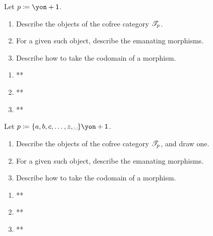 \documentclass[Book-Poly]{subfiles}
\begin{document}
\begin{exercise}
Let $p\coloneqq \yon+\1$.
\begin{enumerate}
	\item Describe the objects of the cofree category $\mathscr{T}_{p}$.
	\item For a given such object, describe the emanating morphisms.
	\item Describe how to take the codomain of a morphism.
\qedhere
\end{enumerate}
\begin{solution}
\begin{enumerate}
    \item **
    \item **
    \item **
\end{enumerate}
\end{solution}
\end{exercise}

\begin{exercise}
Let $p\coloneqq \{a,b,c,\ldots,z,\text{\textvisiblespace}\}\yon+\1$.
\begin{enumerate}
	\item Describe the objects of the cofree category $\mathscr{T}_{p}$, and draw one.
	\item For a given such object, describe the emanating morphisms.
	\item Describe how to take the codomain of a morphism.
\qedhere
\end{enumerate}
\begin{solution}
\begin{enumerate}
    \item **
    \item **
    \item **
\end{enumerate}
\end{solution}
\end{exercise}
\end{document}
